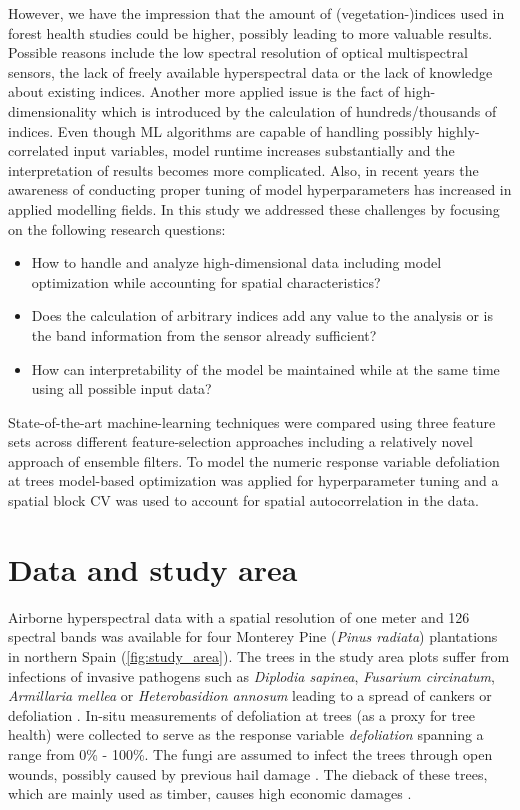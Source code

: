 \documentclass[review]{elsarticle}
\begin{document}
However, we have the impression that the amount of (vegetation-)indices used in forest health studies could be higher, possibly leading to more valuable results.
Possible reasons include the low spectral resolution of optical multispectral sensors, the lack of freely available hyperspectral data or the lack of knowledge about existing indices.
Another more applied issue is the fact of high-dimensionality which is introduced by the calculation of hundreds/thousands of indices.
Even though ML algorithms are capable of handling possibly highly-correlated input variables, model runtime increases substantially and the interpretation of results becomes more complicated.
Also, in recent years the awareness of conducting proper tuning of model hyperparameters has increased in applied modelling fields.
In this study we addressed these challenges by focusing on the following research questions:

\begin{itemize}
	\item How to handle and analyze high-dimensional data including model optimization while accounting for spatial characteristics?
	\item Does the calculation of arbitrary indices add any value to the analysis or is the band information from the sensor already sufficient?
	\item How can interpretability of the model be maintained while at the same time using all possible input data?
\end{itemize}

\noindent State-of-the-art machine-learning techniques were compared using three feature sets across different feature-selection approaches including a relatively novel approach of ensemble filters.
To model the numeric response variable defoliation at trees model-based optimization was applied for hyperparameter tuning and a spatial block \ac{CV} was used to account for spatial autocorrelation in the data.

\section{Data and study area}
\noindent Airborne hyperspectral data with a spatial resolution of one meter and 126 spectral bands was available for four Monterey Pine (\textit{Pinus radiata}) plantations in northern Spain (\autoref{fig:study_area}).
The trees in the study area plots suffer from infections of invasive pathogens such as \textit{Diplodia sapinea}, \textit{Fusarium circinatum}, \textit{Armillaria mellea} or \textit{Heterobasidion annosum} leading to a spread of cankers or defoliation \citep{mesanza2016, iturritxa2017}.
In-situ measurements of defoliation at trees (as a proxy for tree health) were collected to serve as the response variable \textit{defoliation} spanning a range from 0\% - 100\%.
The fungi are assumed to infect the trees through open wounds, possibly caused by previous hail damage \citep{iturritxa2014}.
The dieback of these trees, which are mainly used as timber, causes high economic damages \citep{ganley2009}.
\end{document}
